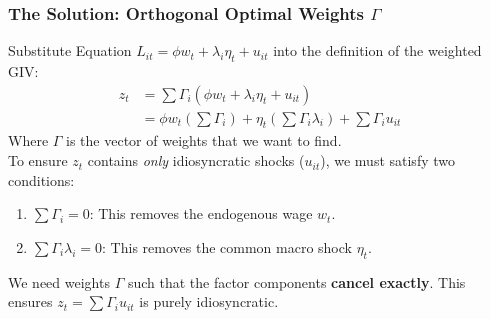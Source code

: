 \documentclass[aspectratio=169,11pt]{beamer}
\begin{document}


\begin{frame}
    \frametitle{The Solution: Orthogonal Optimal Weights $\Gamma$}
    Substitute Equation $L_{it} = \phi w_t + \lambda_i \eta_t + u_{it}$ into the definition of the weighted GIV:
    \begin{align*}
        z_t & = \sum \Gamma_i (\phi w_t + \lambda_i \eta_t + u_{it})                               \\
            & = \phi w_t (\sum \Gamma_i) + \eta_t (\sum \Gamma_i \lambda_i) + \sum \Gamma_i u_{it}
    \end{align*}
    Where $\Gamma$ is the vector of weights that we want to find.\\
    To ensure $z_t$ contains \textit{only} idiosyncratic shocks ($u_{it}$), we must satisfy two conditions:
    \begin{enumerate}
        \item $\sum \Gamma_i = 0$: This removes the endogenous wage $w_t$.
        \item $\sum \Gamma_i \lambda_i = 0$: This removes the common macro shock $\eta_t$.
    \end{enumerate}
    We need weights $\Gamma$ such that the factor components \textbf{cancel exactly}.
    This ensures $z_t = \sum \Gamma_i u_{it}$ is purely idiosyncratic.


\end{frame}
\end{document}
